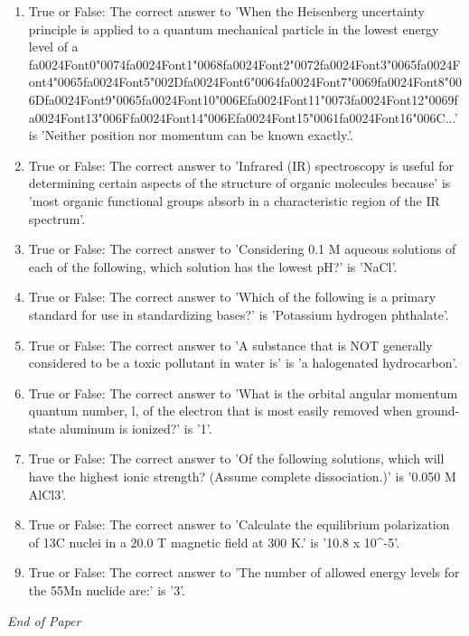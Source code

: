 \documentclass[12pt]{article}
\begin{document}
\begin{enumerate}[label=\arabic*.]
\item True or False: The correct answer to 'When the Heisenberg uncertainty principle is applied to a quantum mechanical particle in the lowest energy level of a {\csname fa0024Font0\endcsname\char"0074}{\csname fa0024Font1\endcsname\char"0068}{\csname fa0024Font2\endcsname\char"0072}{\csname fa0024Font3\endcsname\char"0065}{\csname fa0024Font4\endcsname\char"0065}{\csname fa0024Font5\endcsname\char"002D}{\csname fa0024Font6\endcsname\char"0064}{\csname fa0024Font7\endcsname\char"0069}{\csname fa0024Font8\endcsname\char"006D}{\csname fa0024Font9\endcsname\char"0065}{\csname fa0024Font10\endcsname\char"006E}{\csname fa0024Font11\endcsname\char"0073}{\csname fa0024Font12\endcsname\char"0069}{\csname fa0024Font13\endcsname\char"006F}{\csname fa0024Font14\endcsname\char"006E}{\csname fa0024Font15\endcsname\char"0061}{\csname fa0024Font16\endcsname\char"006C}...' is 'Neither position nor momentum can be known exactly.'.
\item True or False: The correct answer to 'Infrared (IR) spectroscopy is useful for determining certain aspects of the structure of organic molecules because' is 'most organic functional groups absorb in a characteristic region of the IR spectrum'.
\item True or False: The correct answer to 'Considering 0.1 M aqueous solutions of each of the following, which solution has the lowest pH?' is 'NaCl'.
\item True or False: The correct answer to 'Which of the following is a primary standard for use in standardizing bases?' is 'Potassium hydrogen phthalate'.
\item True or False: The correct answer to 'A substance that is NOT generally considered to be a toxic pollutant in water is' is 'a halogenated hydrocarbon'.
\item True or False: The correct answer to 'What is the orbital angular momentum quantum number, l, of the electron that is most easily removed when ground-state aluminum is ionized?' is '1'.
\item True or False: The correct answer to 'Of the following solutions, which will have the highest ionic strength? (Assume complete dissociation.)' is '0.050 M AlCl3'.
\item True or False: The correct answer to 'Calculate the equilibrium polarization of 13C nuclei in a 20.0 T magnetic field at 300 K.' is '10.8 x 10\^{}-5'.
\item True or False: The correct answer to 'The number of allowed energy levels for the 55Mn nuclide are:' is '3'.
\end{enumerate}

\vfill
\noindent\textit{End of Paper}
\end{document}

